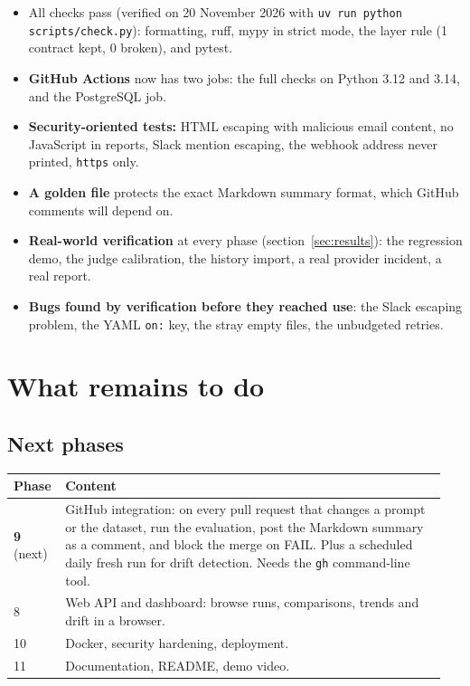 \documentclass[11pt,a4paper]{article}
\newcommand{\code}[1]{\nolinkurl{#1}}
\begin{document}
\begin{itemize}
  \item All checks pass (verified on 20 November 2026 with
        \texttt{uv run python scripts/check.py}): formatting, ruff, mypy in strict mode, the
        layer rule (1 contract kept, 0 broken), and pytest.
  \item \textbf{GitHub Actions} now has two jobs: the full checks on Python 3.12 and 3.14, and
        the PostgreSQL job.
  \item \textbf{Security-oriented tests:} HTML escaping with malicious email content, no
        JavaScript in reports, Slack mention escaping, the webhook address never printed,
        \texttt{https} only.
  \item \textbf{A golden file} protects the exact Markdown summary format, which GitHub
        comments will depend on.
  \item \textbf{Real-world verification} at every phase (section~\ref{sec:results}): the
        regression demo, the judge calibration, the history import, a real provider incident,
        a real report.
  \item \textbf{Bugs found by verification before they reached use}: the Slack escaping
        problem, the YAML \code{on:} key, the stray empty files, the unbudgeted retries.
\end{itemize}

\section{What remains to do}
\label{sec:remaining}

\subsection{Next phases}

\begin{longtable}{@{}p{0.10\linewidth}p{0.85\linewidth}@{}}
\toprule
\textbf{Phase} & \textbf{Content} \\
\midrule
\endhead
\textbf{9} (next) & GitHub integration: on every pull request that changes a prompt or the dataset, run the evaluation, post the Markdown summary as a comment, and block the merge on FAIL. Plus a scheduled daily fresh run for drift detection. Needs the \code{gh} command-line tool. \\
8 & Web API and dashboard: browse runs, comparisons, trends and drift in a browser. \\
10 & Docker, security hardening, deployment. \\
11 & Documentation, README, demo video. \\
\bottomrule
\end{longtable}
\end{document}
